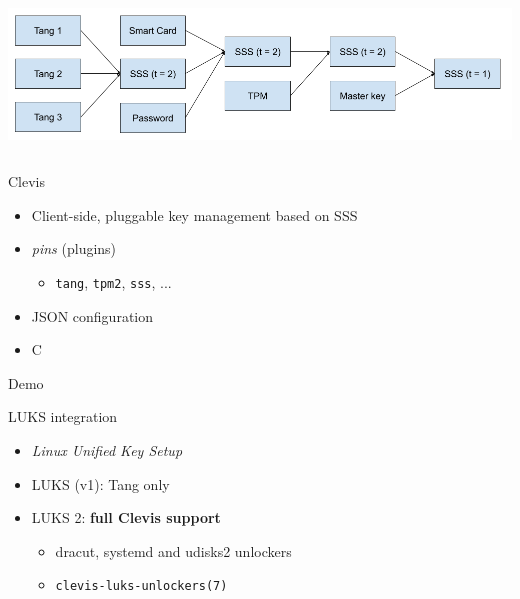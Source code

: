 \documentclass[ignorenonframetext,aspectratio=169]{beamer}
\begin{document}
\begin{frame}[plain]
\begin{columns}
\column{\dimexpr\paperwidth}
  \includegraphics[width=\textwidth]{policy.png}
\end{columns}
\end{frame}

\begin{frame}{Clevis}
\protect\hypertarget{clevis}{}

\begin{itemize}
\item Client-side, pluggable key management based on SSS
\item
  \emph{pins} (plugins)

  \begin{itemize}
  \item {\tt tang}, {\tt tpm2}, {\tt sss}, ...
  \end{itemize}
\item
  JSON configuration
\item
  C
\end{itemize}

\end{frame}

\begin{frame}[plain]
\centering
\huge Demo
\end{frame}

\begin{frame}{LUKS integration}
\protect\hypertarget{luks-integration}{}

\begin{itemize}
\item \emph{Linux Unified Key Setup}
\item LUKS (v1): Tang only
\item LUKS 2: {\bf full Clevis support}
  \begin{itemize}
  \item dracut, systemd and udisks2 unlockers
  \item {\tt clevis-luks-unlockers(7)}
  \end{itemize}
\end{itemize}

\end{frame}
\end{document}
